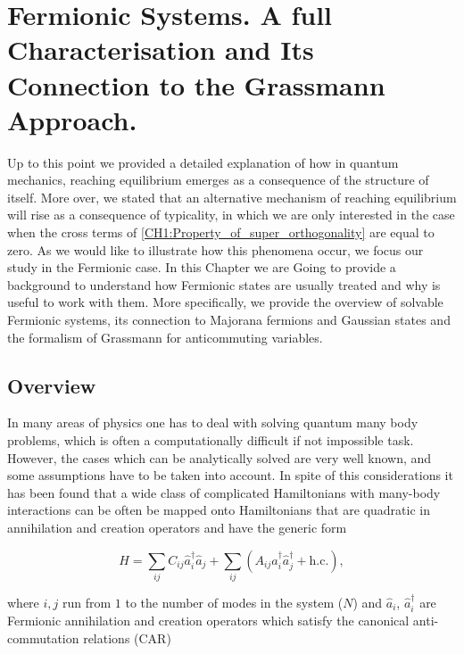 \chapter{ Fermionic Systems. A full Characterisation and Its Connection to the Grassmann Approach.}
Up to this point we provided a detailed explanation of how in quantum mechanics, reaching equilibrium emerges as a consequence of the structure of itself. More over, we stated that an alternative mechanism of reaching equilibrium will rise as a consequence of typicality, in which we are only interested in the case when the cross terms of \eqref{CH1:Property_of_super_orthogonality} are equal to zero.
As we would like to illustrate how this phenomena occur, we focus our study in the Fermionic case. In this Chapter we are Going to provide a background to understand how Fermionic states are usually treated and why is useful to work with them. More specifically, we provide the overview of solvable Fermionic systems, its connection to Majorana fermions and Gaussian states and the formalism of Grassmann for anticommuting variables.
\section{Overview}
In many areas of physics one has to deal with solving quantum many body problems, which is often a computationally difficult if not impossible task. However, the cases which can be analytically solved are very well known, and some assumptions have to be taken into account. In spite of this considerations it has been found that a wide class of complicated Hamiltonians with many-body interactions can be often be mapped onto Hamiltonians that are quadratic in annihilation and creation operators and have the generic form \cite{botero_bcs-like_2004}

\begin{equation}
\hat{H}=\sum_{i j} C_{i j} \hat{a}_{i}^{\dagger} \hat{a}_{j}+\sum_{i j}\left(A_{i j} \hat{a}_{i}^{\dagger}\hat{a}_{j}^{\dagger}+\mathrm{h.c.}\right),
\label{CH2:QuadraticHamiltonian}
\end{equation}

where $i,j$ run from $1$ to the number of modes in the system ($N$) and $\hat{a}_i$, $\hat{a}^{\dagger}_i$ are Fermionic annihilation and creation operators which satisfy the canonical anti-commutation relations (CAR)\cite{fradkin_field_1997}

